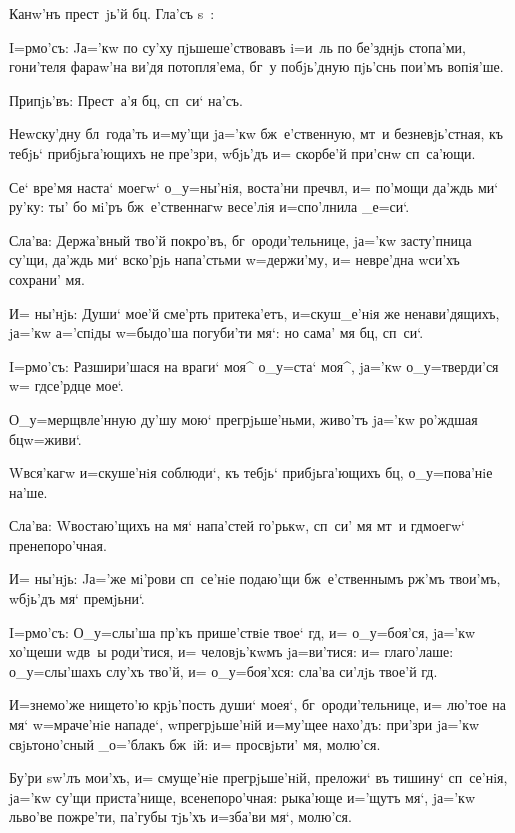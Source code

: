 
Канw'нъ прест~jь'й бц. Гла'съ s~:


I=рмо'съ: Jа='кw по су'ху пjьшеше'ствовавъ i=и~ль по 
бе'зднjь стопа'ми, гони'теля фараw'на ви'дя потопля'ема, 
бг~у побjь'дную пjь'снь пои'мъ вопiя'ше.

Припjь'въ: Прест~а'я бц, сп~си` на'съ.

Неwску'дну бл~года'ть и=му'щи jа='кw бж~е'ственную, 
мт~и безневjь'стная, къ тебjь` прибjьга'ющихъ не пре'зри, 
w\т бjь'дъ и= скорбе'й при'снw сп~са'ющи.

Се` вре'мя наста` моегw` о_у=ны'нiя, воста'ни 
преч вл, и= по'мощи да'ждь ми` ру'ку: ты' бо 
мi'ръ бж~е'ственнагw весе'лiя и=спо'лнила _е=си`.

Сла'ва: Держа'вный тво'й покро'въ, бг~ороди'тельнице, 
jа='кw засту'пница су'щи, да'ждь ми` вско'рjь напа'стьми 
w=держи'му, и= невре'дна w\т си'хъ сохрани' мя.

И= ны'нjь: Души` мое'й сме'рть притека'етъ, 
и=скуш_е'нiя же ненави'дящихъ, jа='кw а='спiды w=быдо'ша 
погуби'ти мя`: но сама' мя бц, сп~си`.


I=рмо'съ: Разшири'шася на враги` моя^ о_у=ста` моя^, 
jа='кw о_у=тверди'ся w= гд се'рдце мое`.

О_у=мерщвле'нную ду'шу мою` прегрjьше'ньми, живо'тъ 
jа='кw ро'ждшая бц w=живи`.

W\т вся'кагw и=скуше'нiя соблюди`, къ тебjь` 
прибjьга'ющихъ бц, о_у=пова'нiе на'ше.

Сла'ва: W\т востаю'щихъ на мя` напа'стей го'рькw, 
сп~си' мя мт~и гд моегw` пренепоро'чная. 

И= ны'нjь: Jа='же мi'рови сп~се'нiе подаю'щи 
бж~е'ственнымъ рж'мъ твои'мъ, w\т бjь'дъ мя` 
премjьни`.


I=рмо'съ: О_у=слы'ша пр'къ прише'ствiе твое` 
гд, и= о_у=боя'ся, jа='кw хо'щеши w\т дв~ы роди'тися, 
и= человjь'кwмъ jа=ви'тися: и= глаго'лаше: о_у=слы'шахъ 
слу'хъ тво'й, и= о_у=боя'хся: сла'ва си'лjь твое'й гд.

И=знемо'же нището'ю крjь'пость души` моея`, 
бг~ороди'тельнице, и= лю'тое на мя` w=мраче'нiе нападе`, 
w\т прегрjьше'нiй и=му'щее нахо'дъ: при'зри jа='кw 
свjьтоно'сный _о='блакъ бж~iй: и= просвjьти' мя, молю'ся.

Бу'ри sw'лъ мои'хъ, и= смуще'нiе прегрjьше'нiй, 
преложи` въ тишину` сп~се'нiя, jа='кw су'щи приста'нище, 
всенепоро'чная: рыка'юще и='щутъ мя`, jа='кw льво'ве 
пожре'ти, па'губы тjь'хъ и=зба'ви мя`, молю'ся.

